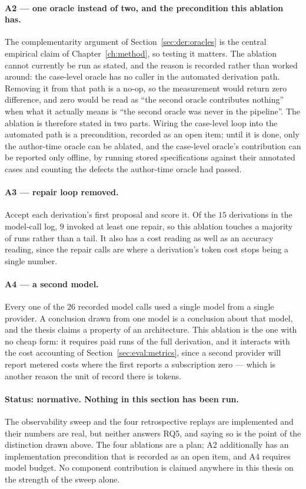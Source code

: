\paragraph{A2 --- one oracle instead of two, and the precondition this ablation has.}
The complementarity argument of Section~\ref{sec:der:oracles} is the central empirical claim of
Chapter~\ref{ch:method}, so testing it matters. The ablation cannot currently be run as stated,
and the reason is recorded rather than worked around: the case-level oracle has no caller in the
automated derivation path. Removing it from that path is a no-op, so the measurement would
return zero difference, and zero would be read as ``the second oracle contributes nothing'' when
what it actually means is ``the second oracle was never in the pipeline''. The ablation is
therefore stated in two parts. Wiring the case-level loop into the automated path is a
precondition, recorded as an open item; until it is done, only the author-time oracle can be
ablated, and the case-level oracle's contribution can be reported only offline, by running
stored specifications against their annotated cases and counting the defects the author-time
oracle had passed.

\paragraph{A3 --- repair loop removed.}
Accept each derivation's first proposal and score it. Of the $15$ derivations in the model-call
log, $9$ invoked at least one repair, so this ablation touches a majority of runs rather than a
tail. It also has a cost reading as well as an accuracy reading, since the repair calls are
where a derivation's token cost stops being a single number.

\paragraph{A4 --- a second model.}
Every one of the $26$ recorded model calls used a single model from a single provider. A
conclusion drawn from one model is a conclusion about that model, and the thesis claims a
property of an architecture. This ablation is the one with no cheap form: it requires paid runs
of the full derivation, and it interacts with the cost accounting of
Section~\ref{sec:eval:metrics}, since a second provider will report metered costs where the
first reports a subscription zero --- which is another reason the unit of record there is
tokens.

\paragraph{Status: normative. Nothing in this section has been run.}
The observability sweep and the four retrospective replays are implemented and their numbers
are real, but neither answers RQ5, and saying so is the point of the distinction drawn above.
The four ablations are a plan; A2 additionally has an implementation precondition that is
recorded as an open item, and A4 requires model budget. No component contribution is claimed
anywhere in this thesis on the strength of the sweep alone.

